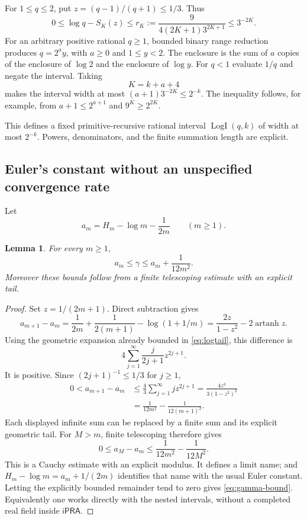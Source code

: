 \documentclass[11pt,a4paper]{article}
\newtheorem{lemma}[theorem]{Lemma}
\theoremstyle{definition}
\newcommand{\ipra}{\mathsf{iPRA}}
\begin{document}
For $1\le q\le2$, put $z=(q-1)/(q+1)\le1/3$. Thus
\begin{equation}\label{eq:uniform-log-tail}
 0\le\log q-S_K(z)
 \le r_K:=\frac{9}{4(2K+1)3^{2K+1}}
 \le3^{-2K}.
\end{equation}
For an arbitrary positive rational $q\ge1$, bounded binary range
reduction produces $q=2^a y$, with $a\ge0$ and $1\le y<2$.
The enclosure is the sum of $a$ copies of the enclosure of $\log2$ and
the enclosure of $\log y$. For $q<1$ evaluate $1/q$ and negate the
interval. Taking
\[
 K=k+a+4
\]
makes the interval width at most
$(a+1)3^{-2K}\le2^{-k}$. The inequality follows, for example, from
$a+1\le2^{a+1}$ and $9^K\ge2^{2K}$.

This defines a fixed primitive-recursive rational interval
$\operatorname{LogI}(q,k)$ of width at most $2^{-k}$. Powers,
denominators, and the finite summation length are explicit.

\subsection{Euler's constant without an unspecified convergence rate}

Let
\[
 a_m=H_m-\log m-\frac1{2m}\qquad(m\ge1).
\]

\begin{lemma}\label{lem:gamma}
For every $m\ge1$,
\begin{equation}\label{eq:gamma-bound}
 a_m\le\gamma\le a_m+\frac1{12m^2}.
\end{equation}
Moreover these bounds follow from a finite telescoping estimate with an
explicit tail.
\end{lemma}
\begin{proof}
Set $z=1/(2m+1)$. Direct subtraction gives
\[
 a_{m+1}-a_m
 =\frac1{2m}+\frac1{2(m+1)}-\log(1+1/m)
 =\frac{2z}{1-z^2}-2\operatorname{artanh}z.
\]
Using the geometric expansion already bounded in
\eqref{eq:logtail}, this difference is
\[
 4\sum_{j=1}^{\infty}\frac{j}{2j+1}z^{2j+1}.
\]
It is positive. Since $(2j+1)^{-1}\le1/3$ for $j\ge1$,
\begin{align*}
 0<a_{m+1}-a_m
 &\le\frac43\sum_{j=1}^{\infty}jz^{2j+1}
 =\frac{4z^3}{3(1-z^2)^2}\\
 &=\frac1{12m^2}-\frac1{12(m+1)^2}.
\end{align*}
Each displayed infinite sum can be replaced by a finite sum and its
explicit geometric tail. For $M>m$, finite telescoping therefore gives
\[
 0\le a_M-a_m
 \le\frac1{12m^2}-\frac1{12M^2}.
\]
This is a Cauchy estimate with an explicit modulus. It defines a limit
name; and $H_m-\log m=a_m+1/(2m)$ identifies that name with the usual
Euler constant. Letting the explicitly bounded remainder tend to zero
gives \eqref{eq:gamma-bound}. Equivalently one works directly with the
nested intervals, without a completed real field inside $\ipra$.
\end{proof}
\end{document}
